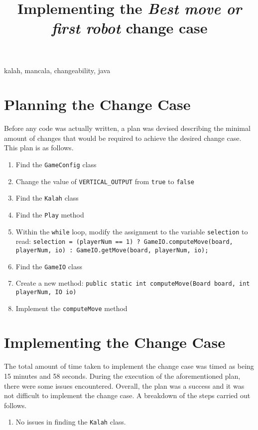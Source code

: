 \documentclass[10pt, a4paper, conference]{IEEEtran}
\begin{document}
\title{Implementing the \textit{Best move or first robot} change case}

\author{
}

\maketitle

\begin{abstract}
\end{abstract}

\begin{IEEEkeywords}
kalah, mancala, changeability, java
\end{IEEEkeywords}

\section{Planning the Change Case}
Before any code was actually written, a plan was devised describing the minimal
amount of changes that would be required to achieve the desired change case.
This plan is as follows.
\begin{enumerate}
  \item Find the \texttt{GameConfig} class
  \item Change the value of \texttt{VERTICAL\_OUTPUT} from \texttt{true} to
    \texttt{false}
  \item Find the \texttt{Kalah} class
  \item Find the \texttt{Play} method
  \item Within the \texttt{while} loop, modify the assignment to the variable
    \texttt{selection} to read: \texttt{selection = (playerNum == 1)
    ? GameIO.computeMove(board, playerNum, io) : GameIO.getMove(board, playerNum, io);}
  \item Find the \texttt{GameIO} class
  \item Create a new method: \texttt{public static int computeMove(Board board,
    int playerNum, IO io)}
  \item Implement the \texttt{computeMove} method
\end{enumerate}

\section{Implementing the Change Case}
The total amount of time taken to implement the change case was timed as being 
15 minutes and 58 seconds. During the execution of the aforementioned plan, there were some
issues encountered. Overall, the plan was a success and it was not difficult to
implement the change case. A breakdown of the steps carried out follows. 
\begin{enumerate}
  \item No issues in finding the \texttt{Kalah} class.
\end{enumerate}
\end{document}
